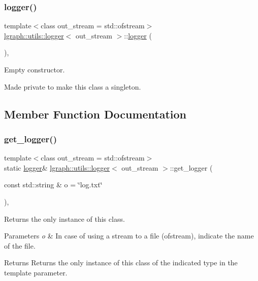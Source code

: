 \subsubsection{\texorpdfstring{logger()}{logger()}}
{\footnotesize\ttfamily template$<$class out\+\_\+stream = std\+::ofstream$>$ \\
\hyperlink{classlgraph_1_1utils_1_1logger}{lgraph\+::utils\+::logger}$<$ out\+\_\+stream $>$\+::\hyperlink{classlgraph_1_1utils_1_1logger}{logger} (\begin{DoxyParamCaption}{ }\end{DoxyParamCaption})\hspace{0.3cm}{\ttfamily [inline]}, {\ttfamily [private]}}



Empty constructor. 

Made private to make this class a singleton. 

\subsection{Member Function Documentation}
\mbox{\label{classlgraph_1_1utils_1_1logger_af9d53836a2c37c72a08cf14f7e071abb}} 
\subsubsection{\texorpdfstring{get\+\_\+logger()}{get\_logger()}}
{\footnotesize\ttfamily template$<$class out\+\_\+stream = std\+::ofstream$>$ \\
static \hyperlink{classlgraph_1_1utils_1_1logger}{logger}\& \hyperlink{classlgraph_1_1utils_1_1logger}{lgraph\+::utils\+::logger}$<$ out\+\_\+stream $>$\+::get\+\_\+logger (\begin{DoxyParamCaption}\item[{const std\+::string \&}]{o = {\ttfamily \char`\"{}log.txt\char`\"{}} }\end{DoxyParamCaption})\hspace{0.3cm}{\ttfamily [inline]}, {\ttfamily [static]}}



Returns the only instance of this class. 


\begin{DoxyParams}{Parameters}
{\em o} & In case of using a stream to a file (ofstream), indicate the name of the file. \\
\hline
\end{DoxyParams}
\begin{DoxyReturn}{Returns}
Returns the only instance of this class of the indicated type in the template parameter. 
\end{DoxyReturn}
\mbox{\label{classlgraph_1_1utils_1_1logger_aa5458017ffc7b65faff47f55a056c2c5}} 
